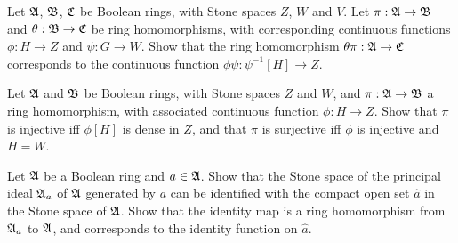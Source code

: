 { Let $\frak A$, $\frak B$, $\frak C$ be Boolean
rings, with Stone spaces $Z$, $W$ and $V$.   Let $\pi:\frak A\to\frak B$
and $\theta:\frak B\to\frak C$ be ring homomorphisms, with corresponding
continuous functions $\phi:H\to Z$ and $\psi:G\to W$.   Show that the
ring homomorphism $\theta\pi:\frak A\to\frak C$ corresponds to the
continuous function $\phi\psi:\psi^{-1}[H]\to Z$.

 Let $\frak A$ and $\frak B$ be Boolean rings,
with Stone spaces $Z$ and $W$, and $\pi:\frak A\to\frak B$ a ring
homomorphism, with associated continuous function $\phi:H\to Z$.   Show
that $\pi$ is injective iff $\phi[H]$ is dense in $Z$, and that $\pi$ is
surjective iff $\phi$ is injective and $H=W$.

 Let $\frak A$ be a Boolean ring and
$a\in\frak A$. Show that the Stone space of the principal ideal
$\frak A_a$ of $\frak A$ generated by $a$ can be identified with the
compact open set $\widehat a$
in the Stone space of $\frak A$.   Show that the identity map is a ring
homomorphism from $\frak A_a$ to $\frak A$, and corresponds to the
identity function on $\widehat a$.
}%

